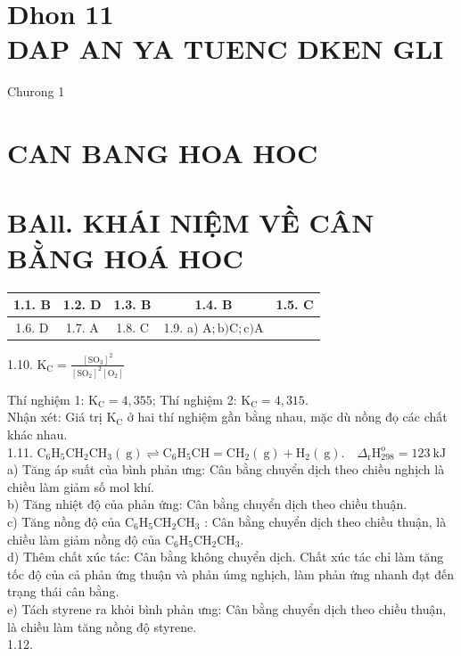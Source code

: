\documentclass[10pt]{article}
\begin{document}
\captionsetup{singlelinecheck=false}
\section*{Dhon 11 \\
 DAP AN YA TUENC DKEN GLI}
Churong 1

\section*{CAN BANG HOA HOC}
\section*{BAll. KHÁI NIỆM VỀ CÂN BẰNG HOÁ HOC}
\begin{center}
\begin{tabular}{|c|c|c|c|c|}
\hline
1.1. B & 1.2. D & 1.3. B & 1.4. B & 1.5. C \\
\hline
1.6. D & 1.7. A & 1.8. C & 1.9. a) $\mathrm{A} ; \mathrm{b}) \mathrm{C} ; \mathrm{c}) \mathrm{A}$ &  \\
\hline
\end{tabular}
\end{center}

1.10. $\mathrm{K}_{\mathrm{C}}=\frac{\left[\mathrm{SO}_{3}\right]^{2}}{\left[\mathrm{SO}_{2}\right]^{2}\left[\mathrm{O}_{2}\right]}$

Thí nghiệm 1: $\mathrm{K}_{\mathrm{C}}=4,355$; Thí nghiệm 2: $\mathrm{K}_{\mathrm{C}}=4,315$.\\
Nhận xét: Giá trị $\mathrm{K}_{\mathrm{C}}$ ở hai thí nghiệm gần bằng nhau, mặc dù nồng đọ các chất khác nhau.\\
1.11. $\mathrm{C}_{6} \mathrm{H}_{5} \mathrm{CH}_{2} \mathrm{CH}_{3}(\mathrm{~g}) \rightleftharpoons \mathrm{C}_{6} \mathrm{H}_{5} \mathrm{CH}=\mathrm{CH}_{2}(\mathrm{~g})+\mathrm{H}_{2}(\mathrm{~g}) . \quad \Delta_{\mathrm{r}} \mathrm{H}_{298}^{\mathrm{o}}=123 \mathrm{~kJ}$\\
a) Tăng áp suất của bình phản ưng: Cân bằng chuyển dịch theo chiều nghịch là chiều làm giảm số mol khí.\\
b) Tăng nhiệt độ của phản ứng: Cân bằng chuyển dịch theo chiều thuận.\\
c) Tăng nồng độ của $\mathrm{C}_{6} \mathrm{H}_{5} \mathrm{CH}_{2} \mathrm{CH}_{3}$ : Cân bằng chuyển dịch theo chiều thuận, là chiều làm giảm nồng độ của $\mathrm{C}_{6} \mathrm{H}_{5} \mathrm{CH}_{2} \mathrm{CH}_{3}$.\\
d) Thêm chất xúc tác: Cân bằng không chuyển dịch. Chất xúc tác chỉ làm tăng tốc độ của cả phản ứng thuận và phản úmg nghịch, làm phản ứng nhanh đạt đến trạng thái cân bằng.\\
e) Tách styrene ra khỏi bình phản ưng: Cân bằng chuyển dịch theo chiều thuận, là chiều làm tăng nồng độ styrene.\\
1.12.
\end{document}
